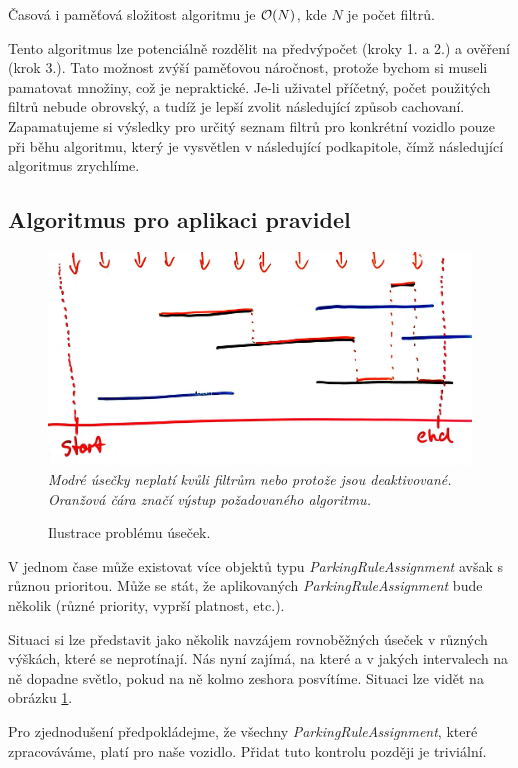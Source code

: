 Časová i paměťová složitost algoritmu je ${\cal O}(N)$, kde $N$ je počet filtrů.

Tento algoritmus lze potenciálně rozdělit na předvýpočet (kroky 1. a 2.) a ověření (krok 3.).
Tato možnost zvýší paměťovou náročnost, protože bychom si museli pamatovat množiny, což je nepraktické.
Je-li uživatel příčetný, počet použitých filtrů nebude obrovský, a tudíž je lepší zvolit následující způsob cachovaní.
Zapamatujeme si výsledky pro určitý seznam filtrů pro konkrétní vozidlo pouze při běhu algoritmu, který je
vysvětlen v následující podkapitole, čímž následující algoritmus zrychlíme.

\subsection{Algoritmus pro aplikaci pravidel}

\begin{figure}[!htb] \centering
  \includegraphics[width=145mm]{../img/rules_drawing.jpg}
  \textit{Modré úsečky neplatí kvůli filtrům nebo protože jsou deaktivované. Oranžová čára značí výstup požadovaného algoritmu.}
  \caption{Ilustrace problému úseček.}
  \label{fig:rules_drawing}
\end{figure}

\noindent
V jednom čase může existovat více objektů typu \textit{ParkingRuleAssignment} avšak s různou prioritou.
Může se stát, že aplikovaných \textit{ParkingRuleAssignment} bude několik (různé priority, vyprší platnost, etc.).

Situaci si lze představit jako několik navzájem rovnoběžných úseček v různých výškách, které se neprotínají.
Nás nyní zajímá, na které a v jakých intervalech na ně dopadne světlo, pokud na ně kolmo zeshora posvítíme.
Situaci lze vidět na obrázku \ref{fig:rules_drawing}.

Pro zjednodušení předpokládejme, že všechny \textit{ParkingRuleAssignment}, které zpracováváme, platí pro naše vozidlo.
Přidat tuto kontrolu později je triviální.

